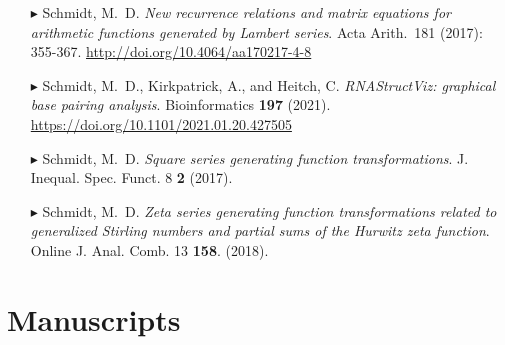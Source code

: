 \documentclass[10pt,letterpaper,sans]{moderncv}        %
\begin{document}
\begin{itemize}
\item[$\blacktriangleright$]
Schmidt, M.~D. \emph{New recurrence relations and matrix equations for 
                     arithmetic functions generated by Lambert series}. 
Acta Arith. 181 (2017): 355-367. 
\url{http://doi.org/10.4064/aa170217-4-8} 

\item[$\blacktriangleright$]
Schmidt, M.~D., Kirkpatrick, A., and Heitch, C. \emph{RNAStructViz: graphical base pairing analysis}. 
Bioinformatics {\bfseries 197} (2021). 
\url{https://doi.org/10.1101/2021.01.20.427505}

\item[$\blacktriangleright$]
Schmidt, M.~D. \emph{Square series generating function transformations}. 
J. Inequal. Spec. Funct. 8 {\bfseries 2} (2017). 

\item[$\blacktriangleright$]
Schmidt, M.~D. \emph{Zeta series generating function transformations related to 
                     generalized Stirling numbers and partial sums of the Hurwitz zeta function}. 
Online J. Anal. Comb. 13 {\bfseries 158}. (2018). 

\end{itemize} 

\section{Manuscripts}
\end{document}

